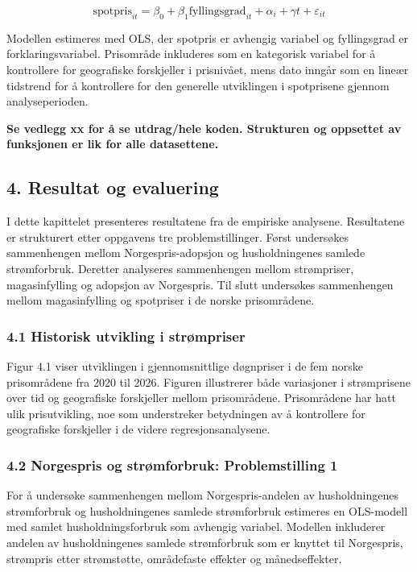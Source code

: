 \documentclass[
  letterpaper,
  DIV=11,
  numbers=noendperiod]{scrartcl}
\begin{document}
\[
\text{spotpris}_{it}
= \beta_0
+ \beta_1 \text{fyllingsgrad}_{it}
+ \alpha_i
+ \gamma t
+ \varepsilon_{it}
\]

Modellen estimeres med OLS, der spotpris er avhengig variabel og
fyllingsgrad er forklaringsvariabel. Prisområde inkluderes som en
kategorisk variabel for å kontrollere for geografiske forskjeller i
prisnivået, mens dato inngår som en lineær tidstrend for å kontrollere
for den generelle utviklingen i spotprisene gjennom analyseperioden.

\textbf{Se vedlegg xx for å se utdrag/hele koden. Strukturen og
oppsettet av funksjonen er lik for alle datasettene.}

\subsection{4. Resultat og evaluering}\label{resultat-og-evaluering}

I dette kapittelet presenteres resultatene fra de empiriske analysene.
Resultatene er strukturert etter oppgavens tre problemstillinger. Først
undersøkes sammenhengen mellom Norgespris-adopsjon og husholdningenes
samlede strømforbruk. Deretter analyseres sammenhengen mellom
strømpriser, magasinfylling og adopsjon av Norgespris. Til slutt
undersøkes sammenhengen mellom magasinfylling og spotpriser i de norske
prisområdene.

\subsubsection{4.1 Historisk utvikling i
strømpriser}\label{historisk-utvikling-i-struxf8mpriser}

Figur 4.1 viser utviklingen i gjennomsnittlige døgnpriser i de fem
norske prisområdene fra 2020 til 2026. Figuren illustrerer både
variasjoner i strømprisene over tid og geografiske forskjeller mellom
prisområdene. Prisområdene har hatt ulik prisutvikling, noe som
understreker betydningen av å kontrollere for geografiske forskjeller i
de videre regresjonsanalysene.

\subsubsection{4.2 Norgespris og strømforbruk: Problemstilling
1}\label{norgespris-og-struxf8mforbruk-problemstilling-1-1}

For å undersøke sammenhengen mellom Norgespris-andelen av
husholdningenes strømforbruk og husholdningenes samlede strømforbruk
estimeres en OLS-modell med samlet husholdningsforbruk som avhengig
variabel. Modellen inkluderer andelen av husholdningenes samlede
strømforbruk som er knyttet til Norgespris, strømpris etter strømstøtte,
områdefaste effekter og månedseffekter.
\end{document}

